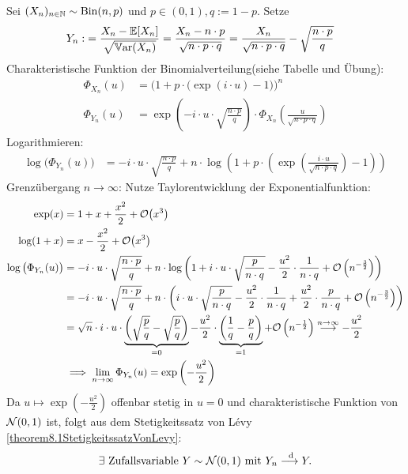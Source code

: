 \begin{beisp}\enter
	Sei $(X_n)_{n\in\mathbb{N}}\sim\operatorname{Bin}(n,p)$ und $p\in(0,1),q:=1-p$. Setze
	\begin{align*}
		Y_n:
		&=\frac{X_n-\mathbb{E}[X_n]}{\sqrt{\mathbb{V}\text{ar}(X_n)}}
		=\frac{X_n-n\cdot p}{\sqrt{n\cdot p\cdot q}}
		=\frac{X_n}{\sqrt{n\cdot p\cdot q}}-\sqrt{\frac{n\cdot p}{q}}
	\end{align*}
	Charakteristische Funktion der Binomialverteilung(siehe Tabelle und Übung):
	\begin{align*}
		\Phi_{X_n}(u)
		&=\Big(1+p\cdot\big(\exp(i\cdot u)-1\big)\Big)^n\\
		\Phi_{Y_n}(u)
		&=\exp\left(-i\cdot u\cdot\sqrt{\frac{n\cdot p}{q}}\right)\cdot\Phi_{X_n}\left(\frac{u}{\sqrt{n\cdot p\cdot q}}\right)
	\end{align*}
	Logarithmieren:
	\begin{align*}
		\log\big(\Phi_{Y_n}(u)\big)
		&=-i\cdot u\cdot\sqrt{\frac{n\cdot p}{q}}+n\cdot\log\left(1+p\cdot\left(\exp\left(\frac{i\cdot u}{\sqrt{n\cdot p\cdot q}}\right)-1\right)\right) 
	\end{align*}
	Grenzübergang $n\to\infty$: Nutze Taylorentwicklung der Exponentialfunktion:
	\begin{align*}
		\exp(x)
		&=1+x+\frac{x^2}{2}+\mathcal{O}\big(x^3\big)\\
		\log(1+x)
		&=x-\frac{x^2}{2}+\mathcal{O}\big(x^3\big)\\
		\log\big(\Phi_{Y_n}(u)\big)
		&=-i\cdot u\cdot\sqrt{\frac{n\cdot p}{q}}+n\cdot\log\left(1+i\cdot u\cdot\sqrt{\frac{p}{n\cdot q}}-\frac{u^2}{2}\cdot\frac{1}{n\cdot q}+\mathcal{O}\left(n^{-\frac{3}{2}}\right)\right)\\
		&=-i\cdot u\cdot\sqrt{\frac{n\cdot p}{q}}+n\cdot\left(i\cdot u\cdot\sqrt{\frac{p}{n\cdot q}}-\frac{u^2}{2}\cdot\frac{1}{n\cdot q}+\frac{u^2}{2}\cdot\frac{p}{n\cdot q}+\mathcal{O}\left(n^{-\frac{3}{2}}\right)\right)\\
		&=\sqrt{n}\cdot i\cdot u\cdot\underbrace{\left(\sqrt{\frac{p}{q}}-\sqrt{\frac{p}{q}}\right)}_{=0}-\frac{u^2}{2}\cdot\underbrace{\left(\frac{1}{q}-\frac{p}{q}\right)}_{=1}+\mathcal{O}\left(n^{-\frac{1}{2}}\right)
		\overset{n\to\infty}{\longrightarrow}-\frac{u^2}{2}\\
		&\implies
		\lim\limits_{n\to\infty}\Phi_{Y_n}(u)=\exp\left(-\frac{u^2}{2}\right)
	\end{align*}
	Da $u\mapsto\exp\left(-\frac{u^2}{2}\right)$ offenbar stetig in $u=0$ und charakteristische Funktion von $\mathcal{N}(0,1)$ ist, 
	folgt aus dem Stetigkeitssatz von Lévy \ref{theorem8.1StetigkeitssatzVonLevy}:
	\begin{align*}
		\exists\text{ Zufallsvariable }Y\sim\mathcal{N}(0,1)\text{ mit } Y_n\overset{\text{ d}}{\longrightarrow}Y.
	\end{align*}
\end{beisp}

